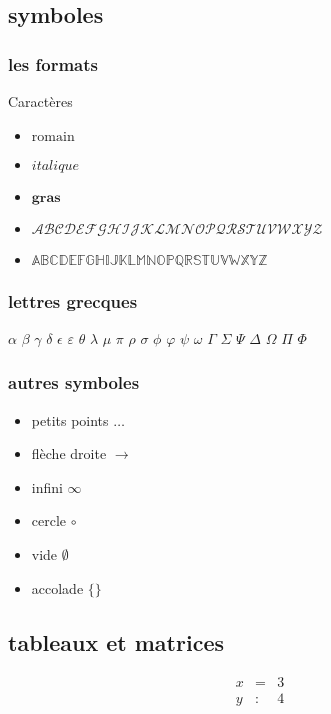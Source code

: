 \subsection{symboles}

\subsubsection{les formats}

Caractères 
\begin{itemize}
	\item $\mathrm{romain}$
	\item $\mathit{italique}$
	\item $\mathbf{gras}$
	\item $\mathcal{ABCDEFGHIJKLMNOPQRSTUVWXYZ}$
	\item $\mathbb{ABCDEFGHIJKLMNOPQRSTUVWXYZ}$
\end{itemize}


\subsubsection{lettres grecques}

$\alpha$ $\beta$ $\gamma$ $\delta$ $\epsilon$ $\varepsilon$ $\theta$ $\lambda$ $\mu$ $\pi$ $\rho$ $\sigma$ $\phi$ $\varphi$ $\psi$ $\omega$ $\Gamma$ $\Sigma$ $\Psi$ $\Delta$ $\Omega$ $\Pi$ $\Phi$



\subsubsection{autres symboles}

\begin{itemize}
	\item petits points  $\dots$
	\item flèche droite  $\rightarrow$
	\item infini $\infty$
	\item cercle $\circ$
	\item vide $\emptyset$
	\item accolade $\lbrace \rbrace$
\end{itemize}

\subsection{tableaux et matrices}

\begin{equation}
	\begin{array}{lcc}
	x & = & 3 \\
	y & : & 4	
	\end{array}
\end{equation}
